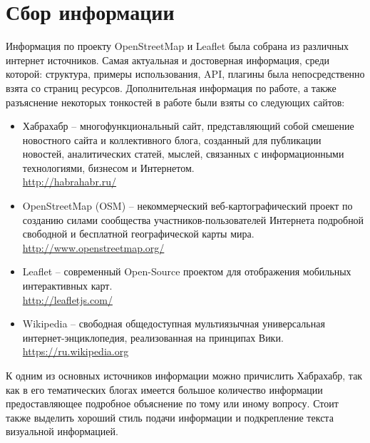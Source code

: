 \documentclass[a4paper, 14pt]{extreport}
\begin{document}
    \chapter{Сбор информации}
    Информация по проекту OpenStreetMap и Leaflet была собрана из различных
    интернет источников. Самая актуальная и достоверная информация, среди
    которой: структура, примеры использования, API, плагины была
    непосредственно взята со страниц ресурсов. Дополнительная информация по
    работе, а также разъяснение некоторых тонкостей в работе были взяты со
    следующих сайтов:
    \begin{itemize}
        \item Хабрахабр -- многофункциональный сайт, представляющий собой
            смешение новостного сайта и коллективного блога, созданный для
            публикации новостей, аналитических статей, мыслей, связанных с
            информационными технологиями, бизнесом и Интернетом.\\
            \url{http://habrahabr.ru/}
        \item OpenStreetMap (OSM) -- некоммерческий веб-картографический проект
            по созданию силами сообщества участников-пользователей Интернета
            подробной свободной и бесплатной географической карты мира.\\
            \url{http://www.openstreetmap.org/}
        \item Leaflet -- современный Open-Source проектом для отображения
            мобильных интерактивных карт.\\
            \url{http://leafletjs.com/}
        \item Wikipedia -- свободная общедоступная мультиязычная
            универсальная интернет-энциклопедия, реализованная на принципах
            Вики.\\
            \url{https://ru.wikipedia.org}
    \end{itemize}
    
    К одним из основных источников информации можно причислить Хабрахабр, так
    как в его тематических блогах имеется большое количество информации
    предоставляющее подробное объяснение по тому или иному вопросу. Стоит также
    выделить хороший стиль подачи информации и подкрепление текста визуальной
    информацией.
\end{document}
